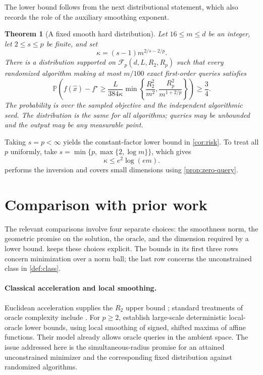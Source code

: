 \documentclass[11pt]{article}
\newcommand{\Prob}{\mathbb{P}}
\newcommand{\cF}{\mathcal{F}}
\newtheorem{theorem}{Theorem}[section]
\theoremstyle{definition}
\theoremstyle{remark}
\begin{document}
The lower bound follows from the next distributional statement, which
also records the role of the auxiliary smoothing exponent.

\begin{theorem}[A fixed smooth hard distribution]
\label{thm:distribution}
Let $16\le m\le d$ be an integer, let $2\le s\le p$ be finite, and set
\begin{equation}
\label{eq:kappa-def}
 \kappa=(s-1)m^{2/s-2/p}.
\end{equation}
There is a distribution supported on $\cF_p(d,L,R_2,R_p)$ such that
every randomized algorithm making at most $m/100$ exact first-order
queries satisfies
\begin{equation}
\label{eq:distribution-lower}
 \Prob\left(f(\widehat x)-f^\star\ge
 \frac{L}{384\kappa}
 \min\left\{\frac{R_2^2}{m^2},
             \frac{R_p^2}{m^{1+2/p}}\right\}\right)\ge\frac34.
\end{equation}
The probability is over the sampled objective and the independent
algorithmic seed. The distribution is the same for all algorithms;
queries may be unbounded and the output may be any measurable point.
\end{theorem}

Taking $s=p<\infty$ yields the constant-factor lower bound in
\cref{cor:risk}. To treat all $p$ uniformly, take
$s=\min\{p,\max\{2,\log m\}\}$, which gives
\begin{equation}
\label{eq:kappa-log}
 \kappa\le e^2\log(em).
\end{equation}
 performs the inversion and covers small
dimensions using \cref{prop:zero-query}.


\section{Comparison with prior work}
\label{sec:related}

The relevant comparisons involve four separate choices: the smoothness
norm, the geometric promise on the solution, the oracle, and the
dimension required by a lower bound. 
keeps these choices explicit. The bounds in its first three rows
concern minimization over a norm ball; the last row concerns the
unconstrained class in \cref{def:class}.

\paragraph{Classical acceleration and local smoothing.}
Euclidean acceleration supplies the $R_2$ upper bound
\citep{Nesterov1983,NemirovskiiNesterov1985}; standard treatments of
oracle complexity include \citet{NemirovskiYudin1983,Nesterov2018,Bubeck2015}.
For $p\ge2$, \citet[Corollary~1]{GuzmanNemirovski2015} establish
large-scale deterministic local-oracle lower bounds, using local
smoothing of signed, shifted maxima of affine functions.
Their model already allows oracle queries in the ambient space.
The issue addressed here is the simultaneous-radius promise for an
attained unconstrained minimizer and the corresponding fixed
distribution against randomized algorithms.
\end{document}
